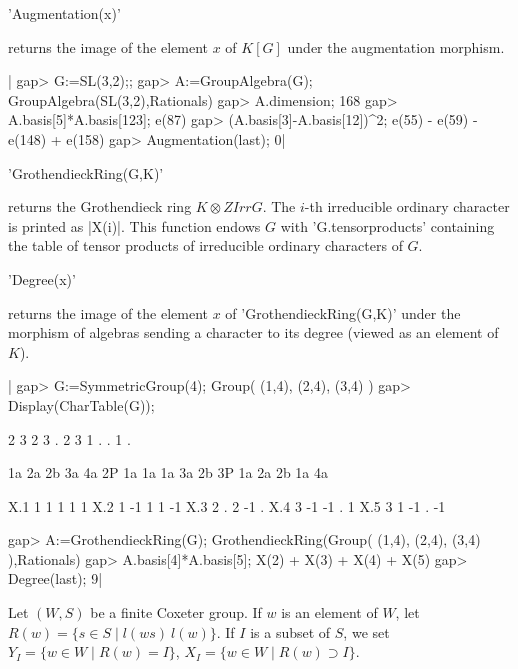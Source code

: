 'Augmentation(x)'

returns  the  image  of  the  element  $x$ of $K[G]$ under the augmentation
morphism.

|    gap> G:=SL(3,2);;
    gap> A:=GroupAlgebra(G);
    GroupAlgebra(SL(3,2),Rationals)
    gap> A.dimension;
    168
    gap> A.basis[5]*A.basis[123];
    e(87)
    gap> (A.basis[3]-A.basis[12])^2;
    e(55) - e(59) - e(148) + e(158)
    gap> Augmentation(last);
    0|


'GrothendieckRing(G,K)'

returns  the Grothendieck ring $K \otimes  Z Irr G$. The $i$-th irreducible
ordinary  character is  printed as  |X(i)|. This  function endows  $G$ with
'G.tensorproducts'  containing the table of  tensor products of irreducible
ordinary characters of $G$.


'Degree(x)'

returns  the image of the element  $x$ of 'GrothendieckRing(G,K)' under the
morphism  of  algebras  sending  a  character  to  its degree (viewed as an
element of $K$).

|    gap> G:=SymmetricGroup(4);
    Group( (1,4), (2,4), (3,4) )
    gap> Display(CharTable(G));

         2  3  2  3  .  2
         3  1  .  .  1  .

           1a 2a 2b 3a 4a
        2P 1a 1a 1a 3a 2b
        3P 1a 2a 2b 1a 4a

    X.1     1  1  1  1  1
    X.2     1 -1  1  1 -1
    X.3     2  .  2 -1  .
    X.4     3 -1 -1  .  1
    X.5     3  1 -1  . -1

    gap> A:=GrothendieckRing(G);
    GrothendieckRing(Group( (1,4), (2,4), (3,4) ),Rationals)
    gap> A.basis[4]*A.basis[5];
    X(2) + X(3) + X(4) + X(5)
    gap> Degree(last);
    9|


Let  $(W,S)$ be a  finite Coxeter group.  If $w$ is  an element of $W$, let
$R(w)=\{s  \in S \mid l(ws) \>  l(w)\}$. If $I$ is a  subset of $S$, we set
$Y_I=\{w \in W \mid R(w)=I\}$, $X_I=\{w \in W \mid R(w) \supset I\}$.

